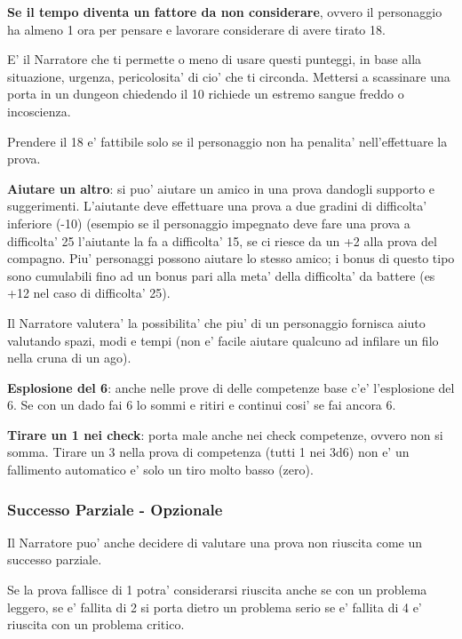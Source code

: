 \documentclass[a4paper,11pt,twoside,openany]{book}
\begin{document}
\textbf{Se il tempo diventa un fattore da non considerare}, ovvero il personaggio ha almeno 1 ora per pensare e lavorare considerare di avere tirato 18.

E' il Narratore che ti permette o meno di usare questi punteggi, in base alla situazione, urgenza, pericolosita' di cio' che ti circonda. Mettersi a scassinare una porta in un dungeon chiedendo il 10 richiede un estremo sangue freddo o incoscienza.

Prendere il 18 e' fattibile solo se il personaggio non ha penalita'
nell'effettuare la prova.

\textbf{Aiutare un altro}: si puo' aiutare un amico in una prova dandogli supporto e suggerimenti. L'aiutante deve effettuare una prova a due gradini di difficolta' inferiore (-10) (esempio se il personaggio impegnato deve fare una prova a difficolta' 25 l'aiutante la fa a difficolta' 15, se ci riesce da un +2 alla prova del compagno. Piu' personaggi possono aiutare lo stesso amico; i bonus di questo tipo sono cumulabili fino ad un bonus pari alla meta' della difficolta' da battere (es +12 nel caso di difficolta' 25).

Il Narratore valutera' la possibilita' che piu' di un personaggio fornisca aiuto valutando spazi, modi e tempi (non e' facile aiutare qualcuno ad infilare un filo nella cruna di un ago).

\textbf{Esplosione del 6}: anche nelle prove di delle competenze base c'e' l'esplosione del 6. Se con un dado fai 6 lo sommi e ritiri e continui cosi' se fai ancora 6.

\textbf{Tirare un 1 nei check}: porta male anche nei check competenze, ovvero non si somma. Tirare un 3 nella prova di competenza (tutti 1 nei 3d6) non e' un fallimento automatico e' solo un tiro molto basso (zero).

\subsubsection{Successo Parziale - Opzionale}

Il Narratore puo' anche decidere di valutare una prova non riuscita come un successo parziale.

Se la prova fallisce di 1 potra' considerarsi riuscita anche se con un problema leggero, se e' fallita di 2 si porta dietro un problema serio se e' fallita di 4 e' riuscita con un problema critico.
\end{document}
